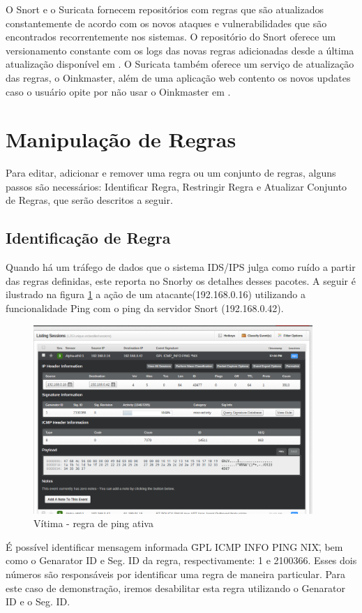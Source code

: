 O Snort e o Suricata fornecem repositórios com regras que são atualizados constantemente
de acordo com os novos ataques e vulnerabilidades que são encontrados recorrentemente nos
 sistemas. O repositório do Snort oferece um versionamento constante com os logs
 das novas regras adicionadas desde a última atualização disponível em \cite{snortRules}. O
 Suricata também oferece um serviço de atualização das regras, o Oinkmaster,
 além de uma aplicação web contento os novos updates caso o usuário opite por
 não usar o Oinkmaster em \cite{suricataRules}.

 \section{Manipulação de Regras}
 Para editar, adicionar e remover uma regra ou um conjunto de regras, alguns passos
 são necessários: Identificar Regra, Restringir Regra e Atualizar Conjunto de Regras,
 que serão descritos a seguir.

 \subsection{Identificação de Regra}
 Quando há um tráfego de dados que o sistema IDS/IPS julga como ruído a partir das
 regras definidas, este reporta no Snorby os detalhes desses pacotes. A seguir
 é ilustrado na figura \ref{fig:regra_ping_ativa} a ação de um atacante(192.168.0.16)
 utilizando a funcionalidade Ping com o ping da servidor Snort (192.168.0.42).

 \begin{figure}[h]
  \centering
  \includegraphics[width=400px, scale=1]{resource/regra_ping_ativa}
  \caption{Vítima - regra de ping ativa}
\label{fig:regra_ping_ativa}
\end{figure}

É possível identificar mensagem informada \"GPL ICMP INFO PING NIX\", bem como
o Genarator ID e Seg. ID da regra, respectivamente: 1 e 2100366. Esses dois
números são responsáveis por identificar uma regra de maneira particular.
Para este caso de demonstração, iremos desabilitar esta regra utilizando o Genarator
ID e o Seg. ID.

